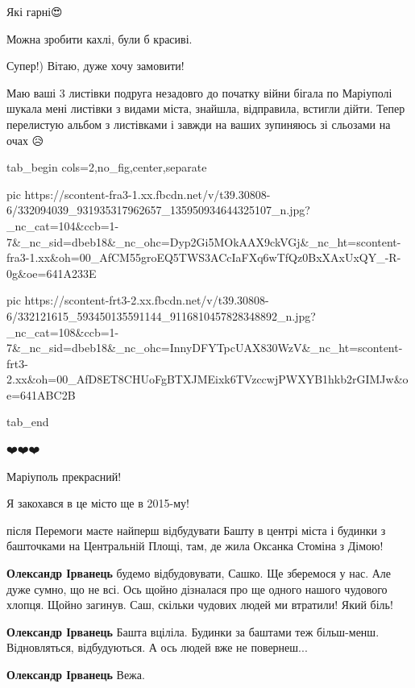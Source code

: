 Які гарні😍


Можна зробити кахлі, були б красиві.


Супер!) Вітаю, дуже хочу замовити!


Маю ваші 3 листівки подруга незадовго до початку війни бігала по Маріуполі
шукала мені листівки з видами міста, знайшла, відправила, встигли дійти. Тепер
перелистую альбом з листівками і завжди на ваших зупиняюсь зі сльозами на очах
😥

\begin{center}
\begin{minipage}{\textwidth}

\ifcmt
  tab_begin cols=2,no_fig,center,separate

     pic https://scontent-fra3-1.xx.fbcdn.net/v/t39.30808-6/332094039_931935317962657_135950934644325107_n.jpg?_nc_cat=104&ccb=1-7&_nc_sid=dbeb18&_nc_ohc=Dyp2Gi5MOkAAX9ckVGj&_nc_ht=scontent-fra3-1.xx&oh=00_AfCM55groEQ5TWS3ACcIaFXq6wTfQz0BxXAxUxQY_-R-0g&oe=641A233E

     pic https://scontent-frt3-2.xx.fbcdn.net/v/t39.30808-6/332121615_593450135591144_9116810457828348892_n.jpg?_nc_cat=108&ccb=1-7&_nc_sid=dbeb18&_nc_ohc=InnyDFYTpcUAX830WzV&_nc_ht=scontent-frt3-2.xx&oh=00_AfD8ET8CHUoFgBTXJMEixk6TVzccwjPWXYB1hkb2rGIMJw&oe=641ABC2B

  tab_end
\fi
\end{minipage}
\end{center}


❤️❤️❤️


Маріуполь прекрасний!

Я закохався в це місто ще в 2015-му!

після Перемоги маєте найперш відбудувати Башту в центрі міста і будинки з
башточками на Центральній Площі, там, де жила Оксанка Стоміна з Дімою!

\begin{itemize} %
\textbf{Олександр Ірванець} будемо відбудовувати, Сашко. Ще зберемося у нас. Але дуже сумно, що не всі. Ось щойно дізналася про ще одного нашого чудового хлопця. Щойно загинув. Саш, скільки чудових людей ми втратили! Який біль!

\textbf{Олександр Ірванець} Башта вціліла. Будинки за баштами теж більш-менш. Відновляться, відбудуються. А ось людей вже не повернеш...

\textbf{Олександр Ірванець} Вежа. 🙂
\end{itemize} %

